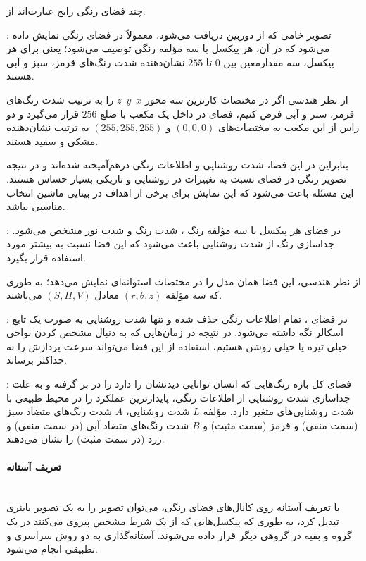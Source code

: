 \documentclass{article}
\begin{document}
چند فضای رنگی رایج عبارت‌اند از:
\begin{description}
\item{:}
تصویر خامی که از دوربین دریافت می‌شود، معمولاً در فضای رنگی  نمایش داده می‌شود که در آن، هر پیکسل با سه مؤلفه رنگی توصیف می‌شود؛ یعنی برای هر پیکسل، سه مقدارمعین بین $0$ تا $255$ نشان‌دهنده شدت رنگ‌های قرمز، سبز و آبی هستند. 
 
از نظر هندسی اگر در مختصات کارتزین  سه محور $x$--$y$--$z$ را به ترتیب شدت رنگ‌های قرمز، سبز و آبی فرض کنیم، فضای  در داخل یک مکعب با ضلع $256$ قرار می‌گیرد و دو راس از این مکعب به مختصات‌های $(0, 0, 0)$ و $(255, 255, 255)$ به ترتیب نشان‌دهنده مشکی و سفید هستند.

بنابراین در این فضا، شدت روشنایی و اطلاعات رنگی درهم‌‌آمیخته شده‌اند و در نتیجه تصویر رنگی در فضای  نسبت به تغییرات در روشنایی و تاریکی بسیار حساس هستند. این مسئله باعث می‌شود که این نمایش برای برخی از اهداف در بینایی ماشین انتخاب مناسبی نباشد.

\item{:}
در فضای  هر پیکسل با سه مؤلفه رنگ ، شدت رنگ  و شدت نور  مشخص می‌شود. جداسازی رنگ از شدت روشنایی باعث می‌شود که این فضا نسبت به  بیشتر مورد استفاده قرار بگیرد.

از نظر هندسی، این فضا همان مدل  را در مختصات استوانه‌ای نمایش می‌دهد؛ به طوری که سه مؤلفه $(r, \theta, z)$ معادل $(S, H, V)$ می‌باشند.
\item{:}
در فضای ، تمام اطلاعات رنگی حذف شده و تنها شدت روشنایی به صورت یک تابع اسکالر نگه داشته می‌شود. در نتیجه در زمان‌هایی که به دنبال مشخص کردن نواحی خیلی تیره یا خیلی روشن هستیم، استفاده از این فضا می‌تواند سرعت پردازش را به حداکثر برساند.

\item{:}
فضای  کل بازه رنگ‌هایی که انسان توانایی دیدنشان را دارد را در بر گرفته و به علت جداسازی شدت روشنایی از اطلاعات رنگی، پایدارترین عملکرد را در محیط طبیعی با شدت روشنایی‌های متغیر دارد. مؤلفه‌ $L$ شدت روشنایی، $A$ شدت رنگ‌های متضاد سبز (سمت منفی) و قرمز (سمت مثبت) و $B$ شدت رنگ‌های متضاد آبی (در سمت منفی) و زرد (در سمت مثبت) را نشان می‌دهند.

\end{description}

\paragraph{تعریف آستانه }\mbox{}\\
با تعریف آستانه روی کانال‌های فضای رنگی، می‌توان تصویر را به یک تصویر باینری تبدیل کرد، به طوری که پیکسل‌هایی که از یک شرط مشخص پیروی می‌کنند در یک گروه و بقیه در گروهی دیگر قرار داده می‌شوند. آستانه‌گذاری به دو روش سراسری و تطبیقی انجام می‌شود.
\end{document}
